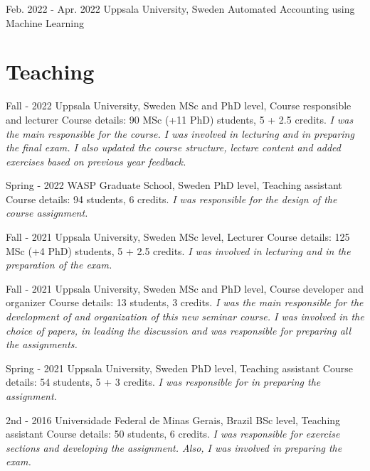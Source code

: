 \documentclass[10pt,letterpaper]{article} %
\begin{document}
        { Feb. 2022 - Apr. 2022 }
        {  }
        { Uppsala University, Sweden }
        { { Automated Accounting using Machine Learning } }
        



\section*{Teaching}


    {   Fall - 2022  }
    { Uppsala University, Sweden }
    { MSc and PhD level, Course responsible and lecturer }
    { Course details: 90 MSc (+11 PhD) students, 5 + 2.5 credits.  \emph{ I was the main responsible for the course. I was involved in lecturing and in preparing the final exam. I also updated the course structure, lecture content and added exercises based on previous year feedback. } }
    
    {   Spring - 2022  }
    { WASP Graduate School, Sweden }
    { PhD level, Teaching assistant }
    { Course details: 94 students, 6 credits.  \emph{ I was responsible for the design of the course assignment. } }
    
    {   Fall - 2021  }
    { Uppsala University, Sweden }
    { MSc level, Lecturer }
    { Course details: 125 MSc (+4 PhD) students, 5 + 2.5 credits.  \emph{ I was involved in lecturing and in the preparation of the exam. } }
    
    {   Fall - 2021  }
    { Uppsala University, Sweden }
    { MSc and PhD level, Course developer and organizer }
    { Course details: 13 students, 3 credits.  \emph{ I was the main responsible for the development of and organization of this new seminar course. I was involved in the choice of papers, in leading the discussion and was responsible for preparing all the assignments. } }
    
    {   Spring - 2021  }
    { Uppsala University, Sweden }
    { PhD level, Teaching assistant }
    { Course details: 54 students, 5 + 3 credits.  \emph{ I was responsible for in preparing the assignment. } }
    
    {   2nd - 2016  }
    { Universidade Federal de Minas Gerais, Brazil }
    { BSc level, Teaching assistant }
    { Course details: 50 students, 6 credits.  \emph{ I was responsible for exercise sections and developing the assignment. Also, I was involved in preparing the exam. } }
    
\end{document}

